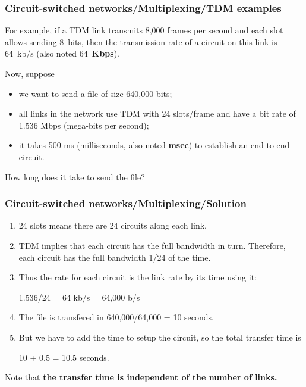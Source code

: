 %
\begin{frame}
\frametitle{Circuit-switched networks/Multiplexing/TDM examples}

For example, if a TDM link transmits 8,000 frames per second and each
slot allows sending 8~bits, then the transmission rate of a circuit on
this link is 64~kb/s (also noted 64~\textbf{Kbps}).

\bigskip

Now, suppose

\begin{itemize}

  \item we want to send a file of size 640,000 bits;

  \item all links in the network use TDM with 24 slots/frame and have
  a bit rate of 1.536 Mbps (mega-bits per second);

  \item it takes 500 ms (milliseconds, also noted \textbf{msec}) to
  establish an end-to-end circuit.

\end{itemize}

How long does it take to send the file?

\end{frame}

%
\begin{frame}
\frametitle{Circuit-switched networks/Multiplexing/Solution}

\begin{enumerate}

  \item 24 slots means there are 24 circuits along each link.

  \item TDM implies that each circuit has the full bandwidth in
  turn. Therefore, each circuit has the full bandwidth 1/24 of the
  time.

  \item Thus the rate for each circuit is the link rate by its time
  using it:

  1.536/24 = 64 kb/s = 64,000 b/s

  \item The file is transfered in 640,000/64,000 = 10 seconds.

  \item But we have to add the time to setup the circuit, so the total
  transfer time is

  10 + 0.5 = 10.5 seconds.

\end{enumerate}

Note that \textbf{the transfer time is independent of the number of
links.}

\end{frame}

